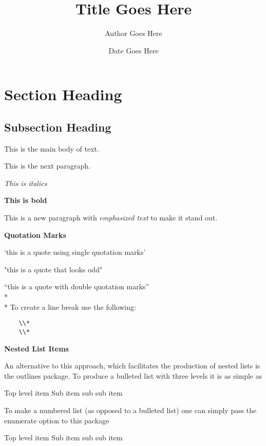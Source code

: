 \documentclass{article}
\title{Title Goes Here}
\author{Author Goes Here}
\date{Date Goes Here}
\begin{document}
\maketitle

\tableofcontents

\pagebreak

\section{Section Heading}
\subsection{Subsection Heading}

This is the main body of text. 

This is the next paragraph. 

\textit{This is italics}

\textbf{This is bold}

This is a new paragraph with \emph{emphasized text} to make it stand out. 

\textbf{Quotation Marks}

`this is a quote using single quotation marks'

"this is a quote that looks odd"

``this is a quote with double quotation marks''
\\*
\\*
To create a line break use the following:
\begin{verbatim}
    \\*
    \\*
\end{verbatim}


\textbf{Nested List Items}

An alternative to this approach, which facilitates the production of nested lists is the outlines package. To produce a bulleted list with three levels it is as simple as

\begin{outline}
 \1 Top level item
   \2 Sub item
     \3 sub sub item
\end{outline}


To make a numbered list (as opposed to a bulleted list) one can simply pass the enumerate option to this package

\begin{outline}[enumerate]
 \1 Top level item
   \2 Sub item
     \3 sub sub item
\end{outline}
\end{document}
